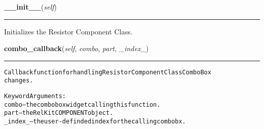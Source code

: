     \label{reliafree:resistors:resistor:Resistor:__init__}

    \vspace{0.5ex}

\hspace{.8\funcindent}\begin{boxedminipage}{\funcwidth}

    \raggedright \textbf{\_\_init\_\_}(\textit{self})

    \vspace{-1.5ex}

    \rule{\textwidth}{0.5\fboxrule}
\setlength{\parskip}{2ex}
    Initializes the Resistor Component Class.

\setlength{\parskip}{1ex}
    \end{boxedminipage}

    \label{reliafree:resistors:resistor:Resistor:combo_callback}

    \vspace{0.5ex}

\hspace{.8\funcindent}\begin{boxedminipage}{\funcwidth}

    \raggedright \textbf{combo\_callback}(\textit{self}, \textit{combo}, \textit{part}, \textit{\_index\_})

    \vspace{-1.5ex}

    \rule{\textwidth}{0.5\fboxrule}
\setlength{\parskip}{2ex}
\begin{alltt}
Callback function for handling Resistor Component Class ComboBox
changes.

Keyword Arguments:
  combo -- the combobox widget calling this function.
   part -- the RelKit COMPONENT object.
\_index\_ -- the user-definded index for the calling combobx.
\end{alltt}

\setlength{\parskip}{1ex}
    \end{boxedminipage}

